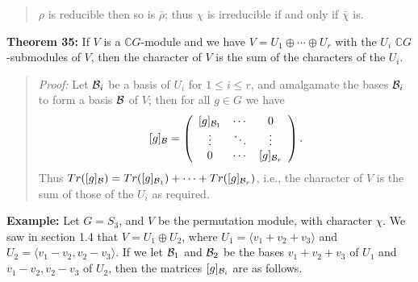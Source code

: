 {\begin{quote}
$\rho$ is reducible then so is $\bar\rho$; thus $\chi$ is irreducible if and
only if $\bar\chi$ is.
\end{quote}
{\bf Theorem 35:} If $V$ is a ${\mathbb C}G$-module and we have
$V=U_1\oplus\cdots\oplus U_r$ with the $U_i$ ${\mathbb C}G$-submodules of $V$, then the
character of $V$ is the sum of the characters of the $U_i$.
\begin{quote}
\emph{Proof:}
Let ${\cal B}_i$ be a basis of $U_i$ for $1\leq i\leq r$, and amalgamate the
bases ${\cal B}_i$ to form a basis ${\cal B}$ of $V$; then for all $g\in G$ we have
$$[g]_{\cal B}=\left(\begin{array}{ccc}[g]_{{\cal B}_1}&\cdots&0\\
\vdots&\ddots&\vdots\\0&\cdots&[g]_{{\cal B}_r}\end{array}\right).$$
Thus $Tr([g]_{\cal B}) =Tr([g]_{{\cal B}_1}) +\cdots+Tr([g]_{{\cal B}_r}) $, i.e., the character of
$V$ is the sum of those of the $U_i$ as required.
\end{quote}
{\bf Example:} Let $G=S_3$, and $V$ be the permutation module, with
character $\chi$. We saw in section 1.4 that $V=U_1\oplus U_2$, where
$U_1=\langle v_1+v_2+v_3\rangle$ and $U_2=\langle v_1-v_2,v_2-v_3\rangle$.
If we let ${\cal B}_1$ and ${\cal B}_2$ be the bases $v_1+v_2+v_3$ of $U_1$ and
$v_1-v_2,v_2-v_3$ of $U_2$, then the matrices $[g]_{{\cal B}_i}$ are as follows.

}
